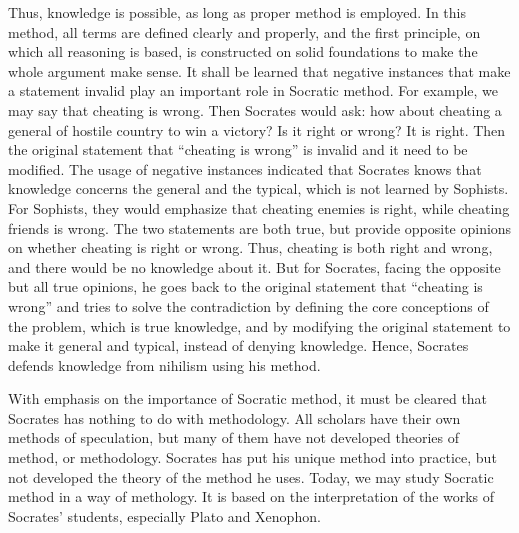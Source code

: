 \documentclass[11pt]{article}
\begin{document}
Thus, knowledge is possible, as long as proper method is employed. 
In this method, all terms are defined clearly and properly, and the first principle, on which all reasoning is based, is constructed on solid foundations to make the whole argument make sense. 
It shall be learned that negative instances that make a statement invalid play an important role in Socratic method. 
For example, we may say that cheating is wrong. 
Then Socrates would ask: 
how about cheating a general of hostile country to win a victory? 
Is it right or wrong? 
It is right. 
Then the original statement that “cheating is wrong” is invalid and it need to be modified. 
The usage of negative instances indicated that Socrates knows that knowledge concerns the general and the typical, which is not learned by Sophists. 
For Sophists, they would emphasize that cheating enemies is right, while cheating friends is wrong. 
The two statements are both true, but provide opposite opinions on whether cheating is right or wrong. 
Thus, cheating is both right and wrong, and there would be no knowledge about it. 
But for Socrates, facing the opposite but all true opinions, he goes back to the original statement that “cheating is wrong” and tries to solve the contradiction by defining the core conceptions of the problem, which is true knowledge, and by modifying the original statement to make it general and typical, instead of denying knowledge. 
Hence, Socrates defends knowledge from nihilism using his method.

\newline

With emphasis on the importance of Socratic method, it must be cleared that Socrates has nothing to do with methodology. 
All scholars have their own methods of speculation, but many of them have not developed theories of method, or methodology. 
Socrates has put his unique method into practice, but not developed the theory of the method he uses. 
Today, we may study Socratic method in a way of methology. 
It is based on the interpretation of the works of Socrates’ students, especially Plato and Xenophon.

\newline
\end{document}
